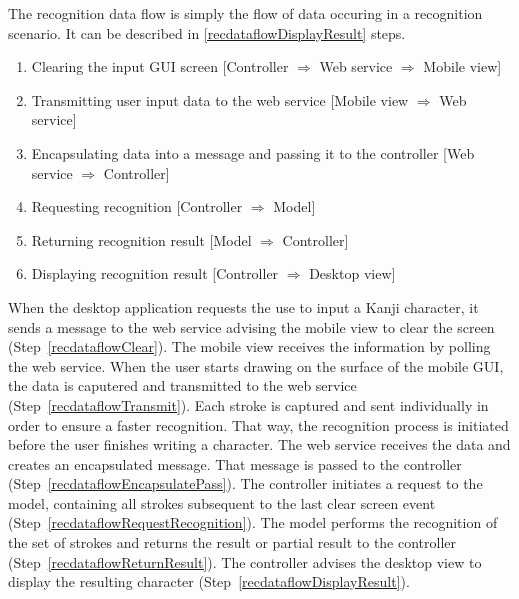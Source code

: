 The recognition data flow is simply the flow of data occuring in a recognition 
scenario. It can be described in \ref{recdataflowDisplayResult} steps.
\begin{enumerate}
  \item \label{recdataflowClear} 
        Clearing the input GUI screen 
        [Controller $\Rightarrow$ Web service $\Rightarrow$ Mobile view]
  \item \label{recdataflowTransmit} 
        Transmitting user input data to the web service 
        [Mobile view $\Rightarrow$ Web service]
  \item \label{recdataflowEncapsulatePass} 
        Encapsulating data into a message and passing 
        it to the controller 
        [Web service $\Rightarrow$ Controller]
  \item \label{recdataflowRequestRecognition} 
        Requesting recognition 
        [Controller $\Rightarrow$ Model] 
  \item \label{recdataflowReturnResult} 
        Returning recognition result 
        [Model $\Rightarrow$ Controller] 
  \item \label{recdataflowDisplayResult} %
        Displaying recognition result 
        [Controller $\Rightarrow$ Desktop view]
\end{enumerate}
When the desktop application requests the use to input a Kanji 
character, it sends a message to the web service advising the mobile view to 
clear the screen (Step~\ref{recdataflowClear}). 
The mobile view receives the information by polling the web service. 
When the user starts drawing on the surface of the mobile GUI, the data is 
caputered and transmitted to the web service (Step~\ref{recdataflowTransmit}).
Each stroke is captured and sent individually in order to ensure a faster 
recognition. That way, the recognition process is initiated before the
user finishes writing a character. The web service receives the data and 
creates an encapsulated message. That message is passed to the 
controller (Step~\ref{recdataflowEncapsulatePass}).
The controller initiates a request to the model, containing all strokes
subsequent to the last clear screen 
event (Step~\ref{recdataflowRequestRecognition}).
The model performs the recognition of the set of strokes and returns the result
or partial result to the controller (Step~\ref{recdataflowReturnResult}).
The controller advises the desktop view to display the resulting character
(Step~\ref{recdataflowDisplayResult}).

